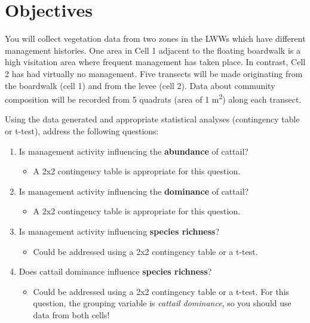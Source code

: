 \documentclass[]{book}
\providecommand{\tightlist}{%
  \setlength{\itemsep}{0pt}\setlength{\parskip}{0pt}}
\begin{document}
\hypertarget{objectives-2}{%
\section{Objectives}\label{objectives-2}}

You will collect vegetation data from two zones in the LWWs which have different management histories. One area in Cell 1 adjacent to the floating boardwalk is a high visitation area where frequent management has taken place. In contrast, Cell 2 has had virtually no management. Five transects will be made originating from the boardwalk (cell 1) and from the levee (cell 2). Data about community composition will be recorded from 5 quadrats (area of 1 m\textsuperscript{2}) along each transect.

\pagebreak

Using the data generated and appropriate statistical analyses (contingency table or t-test), address the following questions:

\begin{enumerate}
\def\labelenumi{\arabic{enumi}.}
\tightlist
\item
  Is management activity influencing the \textbf{abundance} of cattail?

  \begin{itemize}
  \tightlist
  \item
    A 2x2 contingency table is appropriate for this question.
  \end{itemize}
\item
  Is management activity influencing the \textbf{dominance} of cattail?

  \begin{itemize}
  \tightlist
  \item
    A 2x2 contingency table is appropriate for this question.
  \end{itemize}
\item
  Is management activity influencing \textbf{species richness}?

  \begin{itemize}
  \tightlist
  \item
    Could be addressed using a 2x2 contingency table or a t-test.
  \end{itemize}
\item
  Does cattail dominance influence \textbf{species richness}?

  \begin{itemize}
  \tightlist
  \item
    Could be addressed using a 2x2 contingency table or a t-test. For this question, the grouping variable is \emph{cattail dominance}, so you should use data from both cells!
  \end{itemize}
\end{enumerate}
\end{document}
